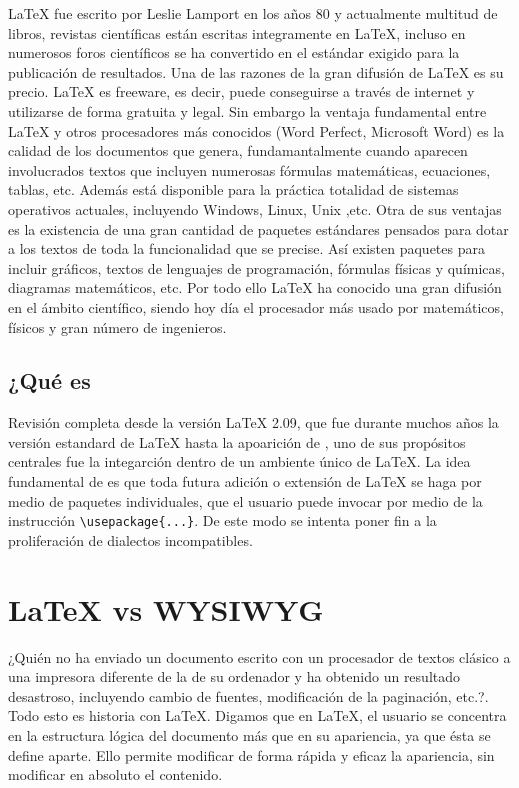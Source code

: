 		\LaTeX{} fue escrito por Leslie Lamport en los a\~nos 80 y actualmente multitud de libros, revistas cient\'ificas 
		est\'an escritas integramente en \LaTeX{}, incluso en numerosos foros cient\'ificos se ha convertido en el 
		est\'andar exigido para la publicaci\'on de resultados. Una de las razones de la gran difusi\'on de \LaTeX{} es su 
		precio. \LaTeX{} es freeware, es decir, puede conseguirse a trav\'es de internet y utilizarse de forma gratuita y 
		legal. Sin embargo la ventaja fundamental entre \LaTeX{} y otros procesadores m\'as conocidos (Word Perfect, 
		Microsoft Word) es la calidad de los documentos que genera, fundamantalmente cuando aparecen involucrados textos 
		que incluyen numerosas f\'ormulas matem\'aticas, ecuaciones, tablas, etc. Adem\'as est\'a disponible para la 
		pr\'actica totalidad de sistemas operativos actuales, incluyendo Windows, Linux, Unix ,etc. Otra de sus ventajas es 
		la existencia de una gran cantidad de paquetes est\'andares pensados para dotar a los textos de toda la funcionalidad 
		que se precise. As\'i existen paquetes para incluir gr\'aficos, textos de lenguajes de programación, f\'ormulas 
		f\'isicas y qu\'imicas, diagramas matem\'aticos, etc. Por todo ello \LaTeX{} ha conocido una gran difusi\'on en el 
		\'ambito cient\'ifico, siendo hoy d\'ia el procesador m\'as usado por matem\'aticos, f\'isicos y gran n\'umero 
		de ingenieros.\\
		
			 
		 
\subsection{¿Qu\'e es \LaTeXe{} }
		Revisi\'on completa desde la versi\'on \LaTeX{} 2.09, que fue durante muchos a\~nos la versi\'on estandard de \LaTeX{} hasta la apoarici\'on de \LaTeXe{}, uno de sus prop\'ositos centrales fue la integarci\'on dentro de un ambiente \'unico de \LaTeX{}. La idea fundamental de \LaTeXe{} es que toda futura adici\'on o extensi\'on de \LaTeX{} se haga por medio de paquetes individuales, que el usuario puede invocar por medio de la instrucci\'on \verb+\usepackage{...}+. De este modo se intenta poner fin a la proliferaci\'on de dialectos incompatibles.  
		
	

\section{\LaTeX{} vs WYSIWYG}
	¿Qui\'en no ha enviado un documento escrito con un procesador de textos cl\'asico a una impresora diferente de la de su ordenador y ha obtenido un  resultado desastroso, incluyendo cambio de fuentes, modificaci\'on de la paginaci\'on, etc.?. Todo esto es historia con \LaTeX{}. Digamos que en \LaTeX{}, el usuario se concentra en la estructura l\'ogica del documento m\'as que en su apariencia, ya que \'esta se define aparte. Ello permite modificar de forma r\'apida y eficaz la apariencia, sin modificar en absoluto el contenido.
	    
